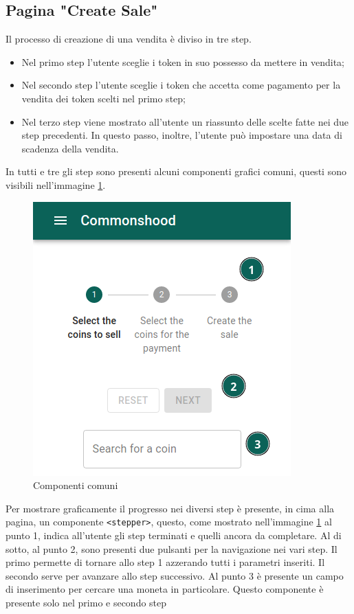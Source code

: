 \documentclass[a4paper]{article}
\begin{document}
        \subsection{Pagina "Create Sale"}
        Il processo di creazione di una vendita è diviso in tre step.
        \begin{itemize}
          \item Nel primo step l'utente sceglie i token in suo possesso da mettere in vendita;
          \item Nel secondo step l'utente sceglie i token che accetta come pagamento per la vendita dei token scelti nel primo step;
          \item Nel terzo step viene mostrato all'utente un riassunto delle scelte fatte nei due step precedenti. In questo passo, inoltre, l'utente può
                impostare una data di scadenza della vendita.
        \end{itemize}
        In tutti e tre gli step sono presenti alcuni componenti grafici comuni, questi sono visibili nell'immagine \ref{fig:commonComponents}.
        \begin{figure}[H]
          \includegraphics[scale=0.6, fbox]{commonComponents.png}
          \centering
          \caption{Componenti comuni}
          \centering
          \label{fig:commonComponents}
        \end{figure}
        Per mostrare graficamente il progresso nei diversi step è presente, in cima alla pagina, un componente
        \verb|<stepper>|, questo, come mostrato nell'immagine \ref{fig:commonComponents} al punto 1, indica all'utente gli step terminati e quelli ancora da completare.
        \newline
        Al di sotto, al punto 2, sono presenti due pulsanti per la navigazione nei vari step. Il primo permette di tornare allo step 1 azzerando tutti i parametri inseriti.
        Il secondo serve per avanzare allo step successivo.
        \newline
        Al punto 3 è presente un campo di inserimento per cercare una moneta in particolare. Questo componente è presente solo nel primo e secondo step
\end{document}
